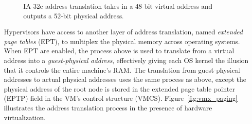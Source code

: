 \begin{figure}[hbtp]
  \caption{
    IA-32e address translation takes in a 48-bit virtual address and outputs
    a 52-bit physical address.
  }
  \label{fig:os_paging}
\end{figure}


Hypervisors have access to another layer of address translation, named
\textit{extended page tables} (EPT), to multiplex the physical memory across
operating systems. When EPT are enabled, the process above is used to translate
from a virtual address into a \textit{guest-physical address}, effectively
giving each OS kernel the illusion that it controls the entire machine's RAM.
The translation from guest-physical addresses to actual physical addresses uses
the same process as above, except the physical address of the root node is
stored in the extended page table pointer (EPTP) field in the VM's control
structure (VMCS). Figure~\ref{fig:vmx_paging} illustrates the address
translation process in the presence of hardware virtualization.

